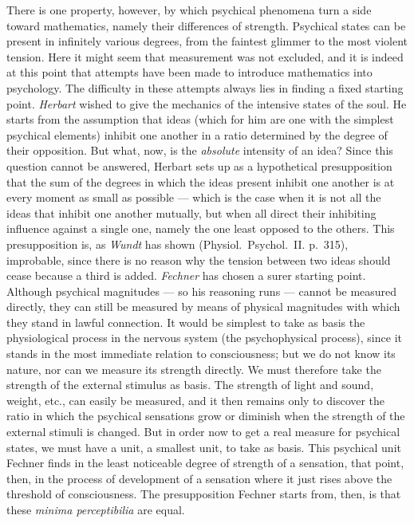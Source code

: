 \documentclass[12pt,a4paper]{book}
\newcommand{\opage}[1]{\marginnote{\footnotesize\textit{[#1]}}}
\begin{document}
There is one property, however, by which psychical phenomena turn a side
toward mathematics, namely their differences of strength. Psychical
states can be present in infinitely various degrees, from the faintest
glimmer to the most violent tension. Here it might seem that measurement
was not excluded, and it is indeed at this point that attempts have been
made to introduce mathematics into psychology. The difficulty in these
attempts always lies in finding a fixed starting point. \emph{Herbart}
wished to give the mechanics of the intensive states of the soul. He
starts from the assumption that ideas (which for him are one with the
simplest psychical elements) inhibit one another in a ratio determined
by the degree of their opposition. But what, now, is the \emph{absolute}
intensity of an idea? Since this question cannot be answered, Herbart
sets up as a hypothetical presupposition that the sum of the degrees in
which the ideas present inhibit one another is at every moment as small
as possible --- which is the case when it is not all the ideas that
inhibit one another mutually, but when all direct their inhibiting
influence against a single one, namely the one least opposed to the
others. This presupposition is, as
\opage{26}\emph{Wundt} has shown (Physiol.\ Psychol.\ II. p.~315),
improbable, since there is no reason why the tension between two ideas
should cease because a third is added. \emph{Fechner} has chosen a surer
starting point. Although psychical magnitudes --- so his reasoning runs
--- cannot be measured directly, they can still be measured by means of
physical magnitudes with which they stand in lawful connection. It would
be simplest to take as basis the physiological process in the nervous
system (the psychophysical process), since it stands in the most
immediate relation to consciousness; but we do not know its nature, nor
can we measure its strength directly. We must therefore take the
strength of the external stimulus as basis. The strength of light and
sound, weight, etc., can easily be measured, and it then remains only to
discover the ratio in which the psychical sensations grow or diminish
when the strength of the external stimuli is changed. But in order now
to get a real measure for psychical states, we must have a unit, a
smallest unit, to take as basis. This psychical unit Fechner finds in the
least noticeable degree of strength of a sensation, that point, then, in
the process of development of a sensation where it just rises above the
threshold of consciousness. The presupposition Fechner starts from, then,
is that these \textit{minima perceptibilia} are equal.
\end{document}
